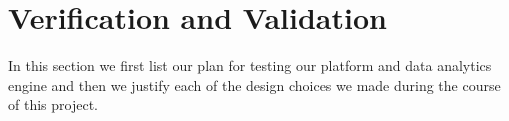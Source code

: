 \section{Verification and Validation}
\label{sec:validation}

In this section we first list our plan for testing our platform and data
analytics engine and then we justify each of the design choices we made
during the course of this project.



